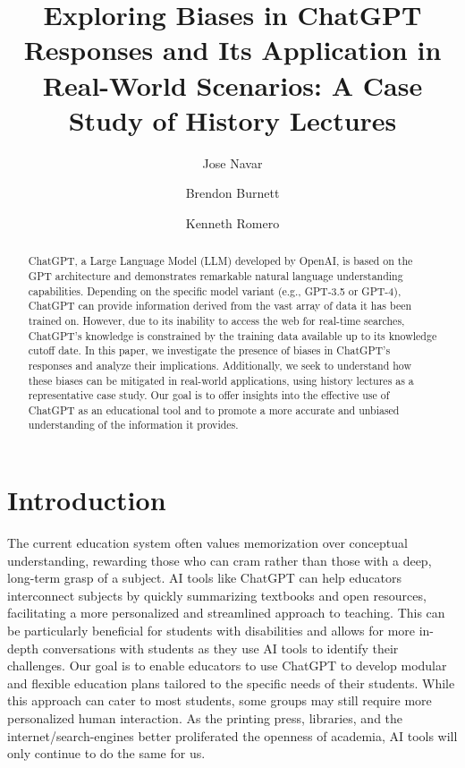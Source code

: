 \documentclass[letterpaper, 10pt, conference]{ieeeconf}
\title{\LARGE \bf
Exploring Biases in ChatGPT Responses and Its Application in Real-World Scenarios: A Case Study of History Lectures
}
\author[1]{Jose Navar}
\author[1]{Brendon Burnett}
\author[1]{Kenneth Romero}
\affil[1]{\emph{University of North Georgia}}
\begin{document}
    \maketitle
    \begin{abstract}
        ChatGPT, a Large Language Model (LLM) developed by OpenAI, is based on the GPT architecture and demonstrates remarkable natural language understanding capabilities. Depending on the specific model variant (e.g., GPT-3.5 or GPT-4), ChatGPT can provide information derived from the vast array of data it has been trained on. However, due to its inability to access the web for real-time searches, ChatGPT's knowledge is constrained by the training data available up to its knowledge cutoff date. In this paper, we investigate the presence of biases in ChatGPT's responses and analyze their implications. Additionally, we seek to understand how these biases can be mitigated in real-world applications, using history lectures as a representative case study. Our goal is to offer insights into the effective use of ChatGPT as an educational tool and to promote a more accurate and unbiased understanding of the information it provides.
    \end{abstract}

    \section{Introduction}
        The current education system often values memorization over conceptual understanding, rewarding those who can cram rather than those with a deep, long-term grasp of a subject. AI tools like ChatGPT can help educators interconnect subjects by quickly summarizing textbooks and open resources, facilitating a more personalized and streamlined approach to teaching. This can be particularly beneficial for students with disabilities and allows for more in-depth conversations with students as they use AI tools to identify their challenges. Our goal is to enable educators to use ChatGPT to develop modular and flexible education plans tailored to the specific needs of their students. While this approach can cater to most students, some groups may still require more personalized human interaction. As the printing press, libraries, and the internet/search-engines better proliferated the openness of academia, AI tools will only continue to do the same for us.
\end{document}
